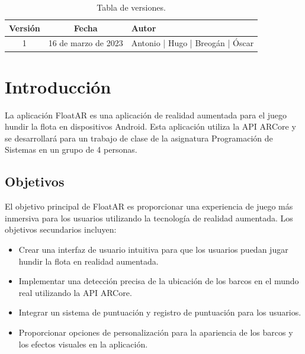 \documentclass[a4paper,openright,12pt]{article}
\begin{document}
\newpage



\tableofcontents

\vspace{5cm}

\begin{flushright}
\begin{table}[hbtp]
\begin{center}

\caption{Tabla de versiones.}
\label{tabla:versiones}
\small
\vspace{1ex}

\begin{tabular}{|c|c|l|}
\hline
Versión & Fecha & Autor \\
\hline \hline
1 & 16 de marzo de 2023 & Antonio | Hugo | Breogán | Óscar\\ \hline
\end{tabular}

\end{center}
\end{table}
\end{flushright}


\newpage
{}


\section{Introducción}\label{cap.introduccion}
La aplicación FloatAR es una aplicación de realidad aumentada para el juego hundir la flota en dispositivos Android. Esta aplicación utiliza la API ARCore y se desarrollará para un trabajo de clase de la asignatura Programación de Sistemas en un grupo de 4 personas.
\subsection{Objetivos}
El objetivo principal de FloatAR es proporcionar una experiencia de juego más inmersiva para los usuarios utilizando la tecnología de realidad aumentada. Los objetivos secundarios incluyen:
\begin{itemize}
\item Crear una interfaz de usuario intuitiva para que los usuarios puedan jugar hundir la flota en realidad aumentada.
\item Implementar una detección precisa de la ubicación de los barcos en el mundo real utilizando la API ARCore.
\item Integrar un sistema de puntuación y registro de puntuación para los usuarios.
\item Proporcionar opciones de personalización para la apariencia de los barcos y los efectos visuales en la aplicación.
\end{itemize}
\end{document}
